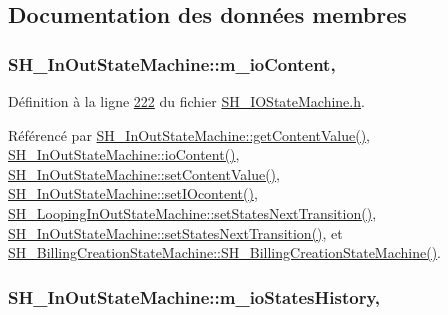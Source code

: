 \subsection{Documentation des données membres}
\hypertarget{classSH__InOutStateMachine_a8cfbc27eef057bf37b7711bdfef2077e}{
\subsubsection[{m\-\_\-io\-Content}]{\setlength{\rightskip}{0pt plus 5cm}S\-H\-\_\-\-In\-Out\-State\-Machine\-::m\-\_\-io\-Content\hspace{0.3cm}{\ttfamily [protected]}, {\ttfamily [inherited]}}}\label{classSH__InOutStateMachine_a8cfbc27eef057bf37b7711bdfef2077e}


Définition à la ligne \hyperlink{SH__IOStateMachine_8h_source_l00222}{222} du fichier \hyperlink{SH__IOStateMachine_8h_source}{S\-H\-\_\-\-I\-O\-State\-Machine.\-h}.



Référencé par \hyperlink{classSH__InOutStateMachine_aa1a3bd3c0ea8a59b9bc916dc718eb9ca}{S\-H\-\_\-\-In\-Out\-State\-Machine\-::get\-Content\-Value()}, \hyperlink{classSH__InOutStateMachine_aaca105fbd5f5cc3bac115389ad3694c5}{S\-H\-\_\-\-In\-Out\-State\-Machine\-::io\-Content()}, \hyperlink{classSH__InOutStateMachine_a9ab1534306b2bdb62743d4bcefe40c17}{S\-H\-\_\-\-In\-Out\-State\-Machine\-::set\-Content\-Value()}, \hyperlink{classSH__InOutStateMachine_a8271a7ec7d5f6502449dd3b4da5f4155}{S\-H\-\_\-\-In\-Out\-State\-Machine\-::set\-I\-Ocontent()}, \hyperlink{classSH__LoopingInOutStateMachine_a0ee122553641721012f3710e71cce234}{S\-H\-\_\-\-Looping\-In\-Out\-State\-Machine\-::set\-States\-Next\-Transition()}, \hyperlink{classSH__InOutStateMachine_a70d6d81c0a8d4afd6aab0a7239edc237}{S\-H\-\_\-\-In\-Out\-State\-Machine\-::set\-States\-Next\-Transition()}, et \hyperlink{classSH__BillingCreationStateMachine_ad62b77fa4aeafe200056ff3974562f83}{S\-H\-\_\-\-Billing\-Creation\-State\-Machine\-::\-S\-H\-\_\-\-Billing\-Creation\-State\-Machine()}.

\hypertarget{classSH__InOutStateMachine_ac46ad1af230e1b2156d805275690dec3}{
\subsubsection[{m\-\_\-io\-States\-History}]{\setlength{\rightskip}{0pt plus 5cm}S\-H\-\_\-\-In\-Out\-State\-Machine\-::m\-\_\-io\-States\-History\hspace{0.3cm}{\ttfamily [protected]}, {\ttfamily [inherited]}}}\label{classSH__InOutStateMachine_ac46ad1af230e1b2156d805275690dec3}


